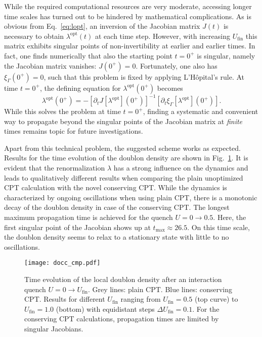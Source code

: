 \documentclass[twocolumn,prb,showpacs,aps,superscriptaddress]{revtex4}
\begin{document}
While the required computational resources are very moderate, accessing longer
time scales has turned out to be hindered by mathematical complications.  As is
obvious from Eq.\ \eqref{eq:lopt}, an inversion of the Jacobian matrix $J(t)$
is necessary to obtain $\lambda^\text{opt}(t)$ at each time step.  However,
with increasing $U_\text{fin}$ this matrix exhibits singular points of
non-invertibility at earlier and earlier times.  In fact, one finds numerically
that also the starting point $t=0^+$ is singular, namely the Jacobian matrix
vanishes: $J(0^+)=0$.  Fortunately, one also has $\xi_\Gamma(0^+)=0$, such that
this problem is fixed by applying L'H\^{o}pital's rule.  At time $t=0^+$, the
defining equation for $\lambda^\text{opt}(0^+)$ becomes
\begin{equation}
  \lambda^\mathrm{opt}(0^+) 
  = 
  -
  \left[
    \partial_t J[\lambda^\text{opt}](0^+)
  \right]^{-1}
  [\partial_t \xi_\Gamma[\lambda^\text{opt}](0^+)].
\end{equation}
While this solves the problem at time $t=0^{+}$, finding a systematic and
convenient way to propagate beyond the singular points of the Jacobian matrix
at {\em finite} times remains topic for future investigations.

Apart from this technical problem, the suggested scheme works as expected.
Results for the time evolution of the doublon density are shown in Fig.\
\ref{fig:docc}.  It is evident that the renormalization $\lambda$ has a strong
influence on the dynamics and leads to qualitatively different results when
comparing the plain unoptimized CPT calculation with the novel conserving CPT.
While the dynamics is characterized by ongoing oscillations when using plain
CPT, there is a monotonic decay of the doublon density in case of the
conserving CPT.  The longest maximum propagation time is achieved for the
quench $U = 0\rightarrow 0.5$.  Here, the first singular point of the Jacobian
shows up at $t_\text{max} \approx 26.5$.  On this time scale, the doublon
density seems to relax to a stationary state with little to no oscillations. 

\begin{figure}
\texttt{[image: docc\_cmp.pdf]}
\caption{
  Time evolution of the local doublon density after an interaction quench
  $U=0\rightarrow U_\text{fin}$.  Grey lines: plain CPT.  Blue lines:
  conserving CPT.  Results for different $U_\text{fin}$ ranging from
  $U_\text{fin} = 0.5$ (top curve) to $U_\text{fin} = 1.0$ (bottom) with
  equidistant steps $\Delta U_\text{fin} = 0.1$.  For the conserving CPT
  calculations, propagation times are limited by singular Jacobians.
}
\label{fig:docc}
\end{figure}
\end{document}

